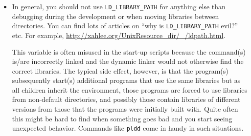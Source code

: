 \begin{itemize}
\begin{itemize}
\item You can also configure the dynamic linker via setting environment
variables.  For example, try this on Solaris:
\begin{verbatim}
LD_LIBRARY_PATH=/tmp LD_DEBUG=libs,detail date
\end{verbatim}
and to find out what options you have to debug the dynamic linker there:
\begin{verbatim}
LD_DEBUG=help date
\end{verbatim}
\item To tell the linker to also look for dynamic libraries in directories other
than the default ones (paths from \texttt{LD\_LIBRARY\_PA\-TH} are searched
first), use it like the following:
\begin{verbatim}
$ cp /lib/libc.so.1 /tmp
$ LD_LIBRARY_PATH=/tmp sleep 100 &
[1] 104547
$ pldd 104547
104547: sleep 100
/tmp/libc.so.1
/usr/lib/locale/cs_CZ.ISO8859-2/cs_CZ.ISO8859-2.so.3
\end{verbatim}
\item You can also edit ELF objects via \texttt{elfedit(1)} on Solaris.  You can
change \texttt{RUNPATH}, for example.
\end{itemize}
\item {} In general, you should not use
\texttt{LD\_LIBRARY\_PATH} for anything else than debugging during the
development or when moving libraries between directories.  You can find lots of
articles on ``why is \texttt{LD\_LIBRARY\_PATH} evil?'' etc.  For example,
\url{http://xahlee.org/UnixResource\_dir/\_/ldpath.html}.

\par
This variable is often misused in the start-up scripts because the command(s)
is/are incorrectly linked and the dynamic linker would not otherwise find the
correct libraries.  The typical side effect, however, is that the program(s)
subsequently start(s) additional programs that use the same libraries but as all
children inherit the environment, those programs are forced to use libraries
from non-default directories, and possibly those contain libraries of different
versions from those that the programs were initially built with.  Quite often
this might be hard to find when something goes bad and you start seeing
unexpected behavior.  Commands like \texttt{pldd} come in handy in such
situations.
\end{itemize}



